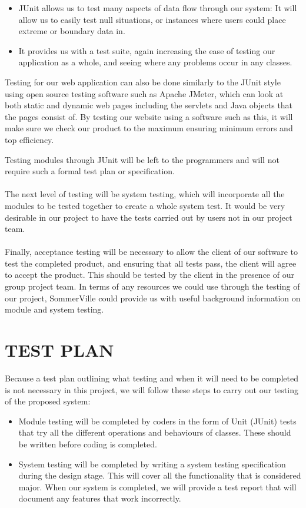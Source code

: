 \documentclass[a4paper]{article}
\begin{document}
\begin{itemize}
\item JUnit allows us to test many aspects of data flow through our system: It will allow us to easily test null situations, or instances where users could place extreme or boundary data in.
\item It provides us with a test suite, again increasing the ease of testing our application as a whole, and seeing where any problems occur in any classes. 
\end{itemize}
Testing for our web application can also be done similarly to the JUnit style using open source testing software such as Apache JMeter, which can look at both static and dynamic web pages including the servlets and Java objects that the pages consist of. By testing our website using a software such as this, it will make sure we check our product to the maximum ensuring minimum errors and top efficiency.

Testing modules through JUnit will be left to the programmers and will not require such a formal test plan or specification.
\\\\
The next level of testing will be system testing, which will incorporate all the modules to be tested together to create a whole system test. It would be very desirable in our project to have the tests carried out by users not in our project team. 
\\\\
Finally, acceptance testing will be necessary to allow the client of our software to test the completed product, and ensuring that all tests pass, the client will agree to accept the product. This should be tested by the client in the presence of our group project team. In terms of any resources we could use through the testing of our project, SommerVille \cite{Software Engineering Ian Sommerville Addison-Wesley Harlow} could provide us with useful background information on module and system testing.
\clearpage

\section{TEST PLAN}
Because a test plan outlining what testing and when it will need to be completed is not necessary in this project, we will follow these steps to carry out our testing of the proposed system:
\begin{itemize}
\item Module testing will be completed by coders in the form of Unit (JUnit) tests that try all the different operations and behaviours of classes. These should be written before coding is completed.
\item System testing will be completed by writing a system testing specification during the design stage. This will cover all the functionality that is considered major. When our system is completed, we will provide a test report that will document any features that work incorrectly.
\end{itemize}
\end{document}
